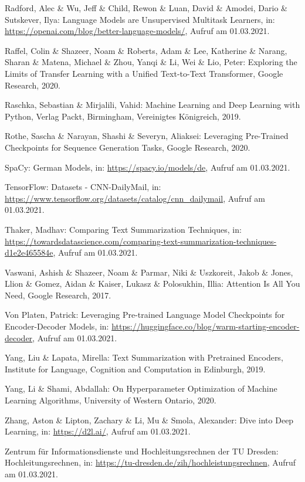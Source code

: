 \begin{thebibliography}{50}
Radford, Alec \& Wu, Jeff \& Child, Rewon \& Luan, David \& Amodei, Dario \& Sutskever, Ilya: Language Models are Unsupervised Multitask Learners, in: \url{https://openai.com/blog/better-language-models/}, Aufruf am 01.03.2021.

Raffel, Colin \& Shazeer, Noam \& Roberts, Adam \& Lee, Katherine \& Narang, Sharan \& Matena, Michael \& Zhou, Yanqi \& Li, Wei \& Lio, Peter: Exploring the Limits of Transfer Learning with a Unified Text-to-Text Transformer, Google Research, 2020.

Raschka, Sebastian \& Mirjalili, Vahid: Machine Learning and Deep Learning with Python, Verlag Packt, Birmingham, Vereinigtes Königreich, 2019.

Rothe, Sascha \& Narayan, Shashi \& Severyn, Aliaksei: Leveraging Pre-Trained Checkpoints for Sequence Generation Tasks, Google Research, 2020.

SpaCy: German Models, in: \url{https://spacy.io/models/de}, Aufruf am 01.03.2021.

TensorFlow: Datasets - CNN-DailyMail, in: \url{https://www.tensorflow.org/datasets/catalog/cnn_dailymail}, Aufruf am 01.03.2021.

Thaker, Madhav: Comparing Text Summarization Techniques, in: \url{https://towardsdatascience.com/comparing-text-summarization-techniques-d1e2e465584e}, Aufruf am 01.03.2021.

Vaswani, Ashish \& Shazeer, Noam \& Parmar, Niki \& Uszkoreit, Jakob \& Jones, Llion \& Gomez, Aidan \& Kaiser, Lukasz \& Polosukhin, Illia: Attention Is All You Need, Google Research, 2017.

Von Platen, Patrick: Leveraging Pre-trained Language Model Checkpoints for Encoder-Decoder Models, in: \url{https://huggingface.co/blog/warm-starting-encoder-decoder}, Aufruf am 01.03.2021.

Yang, Liu \& Lapata, Mirella: Text Summarization with Pretrained Encoders, Institute for Language, Cognition and Computation in Edinburgh, 2019.

Yang, Li \& Shami, Abdallah: On Hyperparameter Optimization of Machine Learning Algorithms, University of Western Ontario, 2020.

Zhang, Aston \& Lipton, Zachary \& Li, Mu \& Smola, Alexander: Dive into Deep Learning, in: \url{https://d2l.ai/}, Aufruf am 01.03.2021.

Zentrum für Informationsdienste und Hochleitungsrechnen der TU Dresden: Hochleitungsrechnen, in: \url{https://tu-dresden.de/zih/hochleistungsrechnen}, Aufruf am 01.03.2021.

\end{thebibliography}
